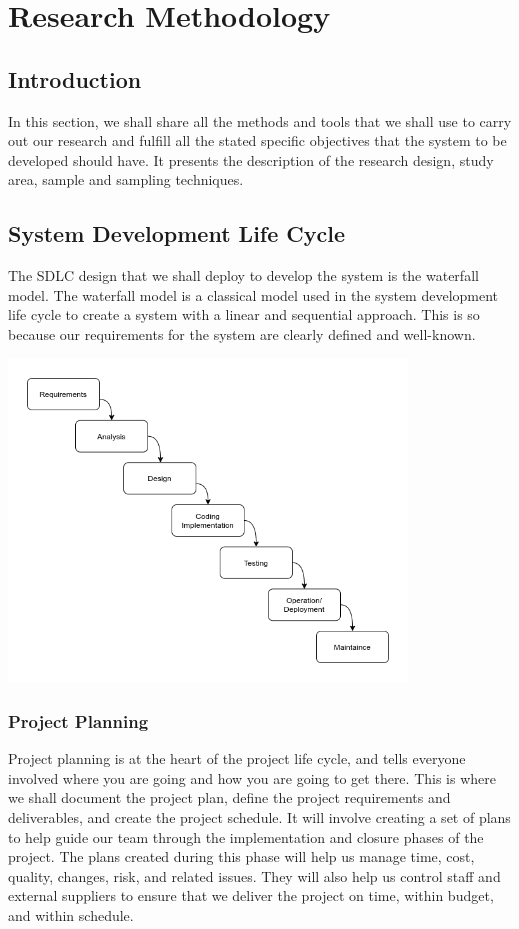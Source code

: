 \documentclass{article}
\begin{document}
\section{Research Methodology}
\subsection{Introduction }
In this section, we shall share all the methods and tools that we shall use to carry out our research and fulfill all the stated specific objectives that the system to be developed should have.  It presents the description of the research design, study area, sample and sampling techniques. 

\subsection{System Development Life Cycle}
The SDLC design that we shall deploy to develop the system is the waterfall model. The waterfall model is a classical model used in the system development life cycle to create a system with a linear and sequential approach. This is so because our requirements for the system are clearly defined and well-known.


\begin{center}
\vspace{30px}
\includegraphics[width=400px]{Images/waterfallv2.png}
\label{waterfall-SDLC-method-image}
\vspace{30px}
\end{center}

\subsubsection{Project Planning}
Project planning is at the heart of the project life cycle, and tells everyone involved where you are going and how you are going to get there. This is where we shall document the project plan, define the project requirements and deliverables, and create the project schedule. It will involve creating a set of plans to help guide our team through the implementation and closure phases of the project. The plans created during this phase will help us manage time, cost, quality, changes, risk, and related issues. They will also help us control staff and external suppliers to ensure that we deliver the project on time, within budget, and within schedule.
\end{document}

